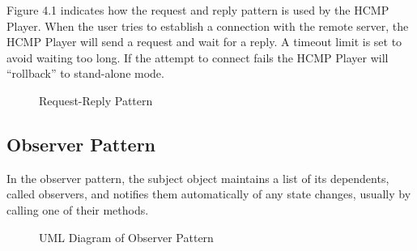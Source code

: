 Figure 4.1 indicates how the request and reply pattern is used by the HCMP Player. 
When the user tries to establish a connection with the remote server, the HCMP Player 
will send a request and wait for a reply. A timeout limit is set to 
avoid waiting too long. If the attempt to connect fails the HCMP Player
will ``rollback'' to stand-alone mode.
\begin{figure}[H]
\caption{Request-Reply Pattern}
\end{figure}

\subsection{Observer Pattern}
In the observer pattern, the subject object maintains a list of its 
dependents, called observers, and notifies them automatically of 
any state changes, usually by calling one of their methods.
\begin{figure}[H]
\caption{UML Diagram of Observer Pattern}
\end{figure}

